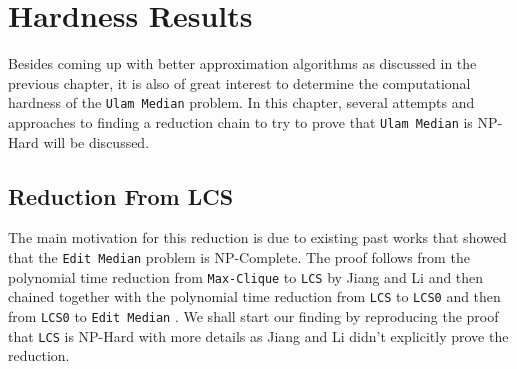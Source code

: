 \chapter{Hardness Results}

Besides coming up with better approximation algorithms as discussed in the previous chapter, it is also of great interest to determine the computational hardness of the \texttt{Ulam Median} problem. In this chapter, several attempts and approaches to finding a reduction chain to try to prove that \texttt{Ulam Median} is NP-Hard will be discussed.

\section{Reduction From LCS}

The main motivation for this reduction is due to existing past works that showed that the \texttt{Edit Median} problem is NP-Complete. The proof follows from the polynomial time reduction from \texttt{Max-Clique} to \texttt{LCS} by Jiang and Li and then chained together with the polynomial time reduction from \texttt{LCS} to \texttt{LCS0} and then from \texttt{LCS0} to \texttt{Edit Median} \cite{HardLCS, MedianString}. We shall start our finding by reproducing the proof that \texttt{LCS} is NP-Hard with more details as Jiang and Li didn't explicitly prove the reduction.

\begin{theorem}
\end{theorem}


